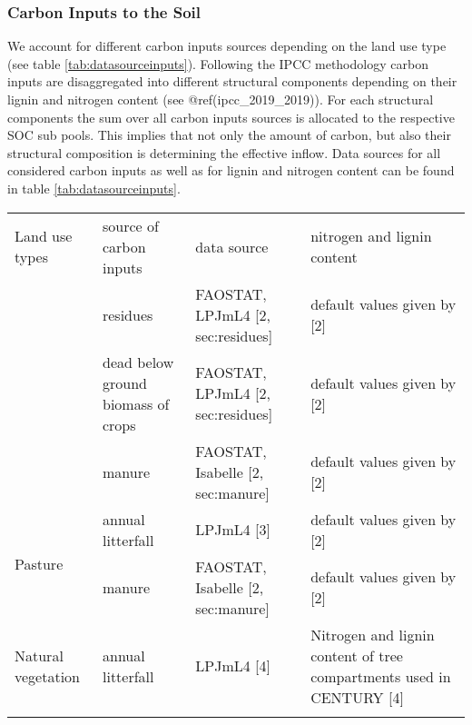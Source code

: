 \documentclass[gc, manuscript]{copernicus}
\begin{document}
\hypertarget{sec:carboninputs}{%
\subsubsection{Carbon Inputs to the Soil}\label{sec:carboninputs}}

We account for different carbon inputs sources depending on the land use type (see table \ref{tab:datasourceinputs}). Following the IPCC methodology carbon inputs are disaggregated into different structural components depending on their lignin and nitrogen content (see @ref(ipcc\_2019\_2019)). For each structural components the sum over all carbon inputs sources is allocated to the respective SOC sub pools. This implies that not only the amount of carbon, but also their structural composition is determining the effective inflow. Data sources for all considered carbon inputs as well as for lignin and nitrogen content can be found in table \ref{tab:datasourceinputs}.

 \begin{table*}[h]
 \caption{Type and data sources for carbon inputs to different land use types}
 \begin{tabular}{l l l l}
 \tophline
  Land use types   & source of carbon inputs & data source & nitrogen and lignin content \\
 \middlehline
 \multirow{3}{*}{Cropland} & residues & FAOSTAT, LPJmL4 [2, sec:residues] & default values given by [2]  \\
                            & dead below ground biomass of crops & FAOSTAT, LPJmL4 [2, sec:residues] & default values given by [2] \\
                            & manure & FAOSTAT, Isabelle [2, sec:manure] & default values given by [2] \\
                            \hline
 \multirow{2}{*}{Pasture}  & annual litterfall & LPJmL4 [3] & default values given by [2] \\ 
                            & manure  & FAOSTAT, Isabelle [2, sec:manure] & default values given by [2] \\
                            \hline
  Natural vegetation        & annual litterfall & LPJmL4 [4]& \begin{minipage}[t]{0.28\columnwidth}\raggedright\strut Nitrogen and lignin content of tree compartments used in CENTURY [4] \strut \end{minipage}\tabularnewline
 \bottomhline
 \end{tabular}
 \label{tab:datasourceinputs}
 \belowtable{}
 \end{table*}
\end{document}
